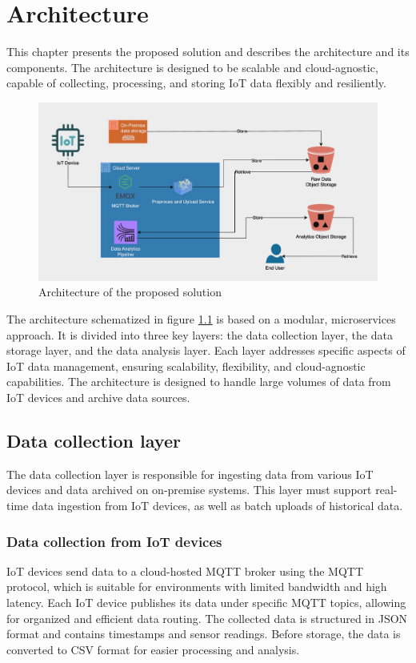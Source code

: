 \chapter{Architecture}
\label{cap:method}

This chapter presents the proposed solution and describes the architecture and its components. The architecture is designed to be scalable and cloud-agnostic, capable of collecting, processing, and storing IoT data flexibly and resiliently.


\begin{figure}[htbp]
    \centering
    \includegraphics[width=1\textwidth]{Immagini/architecture.png}
    \caption{Architecture of the proposed solution}
    \label{fig:architecture}
\end{figure}

The architecture schematized in figure \ref{fig:architecture} is based on a modular, microservices approach. It is divided into three key layers: the data collection layer, the data storage layer, and the data analysis layer. Each layer addresses specific aspects of IoT data management, ensuring scalability, flexibility, and cloud-agnostic capabilities. The architecture is designed to handle large volumes of data from IoT devices and archive data sources.

\section{Data collection layer}

The data collection layer is responsible for ingesting data from various IoT devices and data archived on on-premise systems. This layer must support real-time data ingestion from IoT devices, as well as batch uploads of historical data.

\subsection{Data collection from IoT devices}
IoT devices send data to a cloud-hosted MQTT broker using the MQTT protocol, which is suitable for environments with limited bandwidth and high latency. Each IoT device publishes its data under specific MQTT topics, allowing for organized and efficient data routing. The collected data is structured in JSON format and contains timestamps and sensor readings. Before storage, the data is converted to CSV format for easier processing and analysis.

